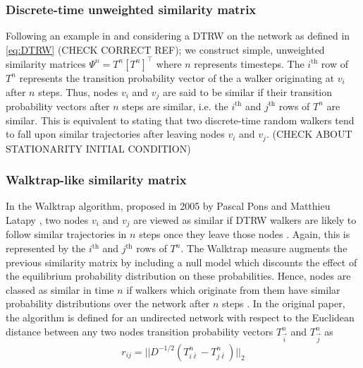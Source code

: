 \documentclass[12pt,a4paper]{article}
\begin{document}
\subsubsection{Discrete-time unweighted similarity matrix} \label{sec:DTRW similarity matrix}
Following an example in \cite{schaub2019multiscale} and considering a DTRW on the network as defined in \ref{eq:DTRW} (CHECK CORRECT REF); we construct simple, unweighted similarity matrices $\Psi^n = T^n [T^n] ^\top$ where $n$ represents timesteps. The $i^{\text{th}}$ row of $T^n$ represents the transition probability vector of the a walker originating at $v_i$ after $n$ steps. Thus, nodes $v_i$ and $v_j$ are said to be similar if their transition probability vectors after $n$ steps are similar, i.e. the $i^{\text{th}}$ and $j^{\text{th}}$ rows of $T^n$ are similar. This is equivalent to stating that two discrete-time random walkers tend to fall upon similar trajectories after leaving nodes $v_i$ and $v_j$.
(CHECK ABOUT STATIONARITY INITIAL CONDITION)

\subsubsection{Walktrap-like similarity matrix} \label{sec:Walktrap similarity matrix}
In the Walktrap algorithm, proposed in 2005 by Pascal Pons and Matthieu Latapy \cite{pons2006walktrap}, two nodes $v_i$ and $v_j$ are viewed as similar if DTRW walkers are likely to follow similar trajectories in $n$ steps once they leave those nodes \cite{lambiottenotes}. Again, this is represented by the $i^{\text{th}}$ and $j^{\text{th}}$ rows of $T^n$. The Walktrap measure augments the previous similarity matrix by including a null model which discounts the effect of the equilibrium probability distribution on these probabilities.  \medskip
\noindent Hence, nodes are classed as similar in time $n$ if walkers which originate from them have similar probability distributions over the network after $n$ steps \cite{pons,lecs}. In the original paper, the algorithm is defined for an undirected network with respect to the Euclidean distance between any two nodes transition probability vectors $T_{\vec{i}}^n$ and $T_{\vec{j}}^n$ as
\begin{equation}
  r_{ij} = ||D^{-1/2}(T_{i \bar \ell}^n - T_{j \bar \ell}^n)||_2
\end{equation}
\end{document}
